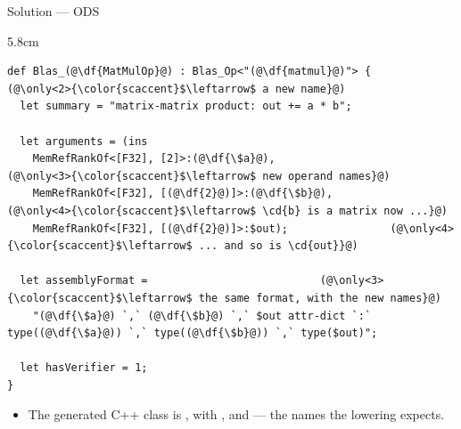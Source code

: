 \documentclass[aspectratio=169,10pt]{beamer}
\begin{document}
\begin{frame}[fragile]{Solution --- ODS}
  \begin{stage}{5.8cm}
\begin{lstlisting}[language=ods,deletestring={[b]"}]
def Blas_(@\df{MatMulOp}@) : Blas_Op<"(@\df{matmul}@)"> {                  (@\only<2>{\color{scaccent}$\leftarrow$ a new name}@)
  let summary = "matrix-matrix product: out += a * b";

  let arguments = (ins
    MemRefRankOf<[F32], [2]>:(@\df{\$a}@),                   (@\only<3>{\color{scaccent}$\leftarrow$ new operand names}@)
    MemRefRankOf<[F32], [(@\df{2}@)]>:(@\df{\$b}@),                   (@\only<4>{\color{scaccent}$\leftarrow$ \cd{b} is a matrix now ...}@)
    MemRefRankOf<[F32], [(@\df{2}@)]>:$out);                (@\only<4>{\color{scaccent}$\leftarrow$ ... and so is \cd{out}}@)

  let assemblyFormat =                           (@\only<3>{\color{scaccent}$\leftarrow$ the same format, with the new names}@)
    "(@\df{\$a}@) `,` (@\df{\$b}@) `,` $out attr-dict `:` type((@\df{\$a}@)) `,` type((@\df{\$b}@)) `,` type($out)";

  let hasVerifier = 1;
}
\end{lstlisting}
  \vspace{0.4em}
  \begin{itemize}
    \item<5-> The generated C++ class is , with
      ,  and  --- the names the lowering
      expects.
  \end{itemize}
  \end{stage}
\end{frame}
\end{document}
